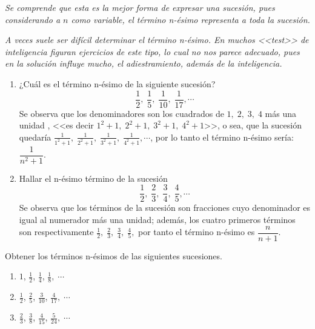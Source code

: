 \textsl{\small{}Se comprende que esta es la mejor forma de expresar
una sucesión, pues considerando a $n$ como variable, el término n-ésimo
representa a toda la sucesión.}{\small \par}

\textsl{\small{}A veces suele ser difícil determinar el término n-ésimo.
En muchos <<test>> de inteligencia figuran ejercicios de este tipo,
lo cual no nos parece adecuado, pues en la solución influye mucho,
el adiestramiento, además de la inteligencia.}{\small \par}

\begin{ejemplos}\label{ej:n-esimo}
\begin{enumerate}
\item ¿Cuál es el término n-ésimo de la siguiente sucesión?
\[
\frac{1}{2},\;\frac{1}{5},\;\frac{1}{10},\;\frac{1}{17},\cdots
\]
 \sol Se observa que los denominadores son los cuadrados de $1,\;2,\;3,\;4$
más una unidad , <<es decir $1^{2}+1,\;2^{2}+1,\;3^{2}+1,\;4^{2}+1$>>,
o sea, que la sucesión quedaría $\frac{1}{1^{2}+1},\;\frac{1}{2^{2}+1},\;\frac{1}{3^{2}+1},\;\frac{1}{4^{2}+1},\cdots$,
por lo tanto el término n-ésimo sería: $\dfrac{1}{n^{2}+1}.$ \fin
\item Hallar el n-ésimo término de la sucesión 
\[
\frac{1}{2},\;\frac{2}{3},\;\frac{3}{4},\;\frac{4}{5},\cdots
\]
\sol Se observa que los términos de la sucesión son fracciones cuyo
denominador es igual al numerador más una unidad; además, los cuatro
primeros términos son respectivamente $\frac{1}{2},\;\frac{2}{3},\;\frac{3}{4},\;\frac{4}{5},$
por tanto el término n-ésimo es $\dfrac{n}{n+1}.$ \fin
\end{enumerate}
\end{ejemplos}

\begin{ejercicios}[]

Obtener los términos n-ésimos de las siguientes sucesiones.

\doublespacing
\begin{enumerate}
\item $1$, $\frac{1}{2}$, $\frac{1}{4}$, $\frac{1}{8},\;\cdots$
\item $\frac{1}{2}$, $\frac{2}{5}$, $\frac{3}{10}$, $\frac{4}{17},\;\cdots$
\item $\frac{2}{3}$, $\frac{3}{8}$, $\frac{4}{15}$, $\frac{5}{24},\;\cdots$
\end{enumerate}
\end{ejercicios}

